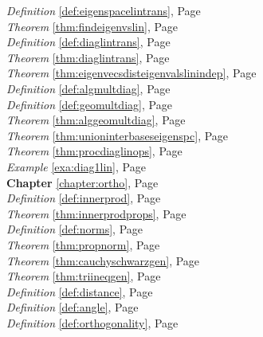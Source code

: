 \begin{multicols}{3}
\begin{center}
      \textit{Definition} \ref{def:eigenspacelintrans}, Page \pageref{def:eigenspacelintrans} \\
      \textit{Theorem} \ref{thm:findeigenvslin}, Page \pageref{thm:findeigenvslin} \\
      \textit{Definition} \ref{def:diaglintrans}, Page \pageref{def:diaglintrans} \\
      \textit{Theorem} \ref{thm:diaglintrans}, Page \pageref{thm:diaglintrans} \\
      \textit{Theorem} \ref{thm:eigenvecsdisteigenvalslinindep}, Page \pageref{thm:eigenvecsdisteigenvalslinindep} \\
      \textit{Definition} \ref{def:algmultdiag}, Page \pageref{def:algmultdiag} \\
      \textit{Definition} \ref{def:geomultdiag}, Page \pageref{def:geomultdiag} \\
      \textit{Theorem} \ref{thm:alggeomultdiag}, Page \pageref{thm:alggeomultdiag} \\
      \textit{Theorem} \ref{thm:unioninterbaseseigenspc}, Page \pageref{thm:unioninterbaseseigenspc} \\
      \textit{Theorem} \ref{thm:procdiaglinops}, Page \pageref{thm:procdiaglinops} \\
      \textit{Example} \ref{exa:diag1lin}, Page \pageref{exa:diag1lin} \\
      \textbf{Chapter} \ref{chapter:ortho}, Page \pageref{chapter:ortho} \\
      \textit{Definition} \ref{def:innerprod}, Page \pageref{def:innerprod} \\
      \textit{Theorem} \ref{thm:innerprodprops}, Page \pageref{thm:innerprodprops} \\
      \textit{Definition} \ref{def:norms}, Page \pageref{def:norms} \\
      \textit{Theorem} \ref{thm:propnorm}, Page \pageref{thm:propnorm} \\
      \textit{Theorem} \ref{thm:cauchyschwarzgen}, Page \pageref{thm:cauchyschwarzgen} \\
      \textit{Theorem} \ref{thm:triineqgen}, Page \pageref{thm:triineqgen} \\
      \textit{Definition} \ref{def:distance}, Page \pageref{def:distance} \\
      \textit{Definition} \ref{def:angle}, Page \pageref{def:angle} \\
      \textit{Definition} \ref{def:orthogonality}, Page \pageref{def:orthogonality} \\

\end{center}
\end{multicols}

